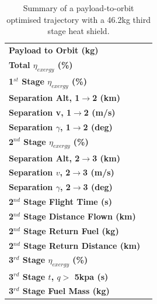 \begin{table}[!ht]
	\centering
	
	\begin{tabular}{l c } 
		\hline \textbf{Payload to Orbit (kg)}
		& \textbf{\PayloadToOrbitTPSreduced}
		\\
		\textbf{Total $\eta_{exergy}$ (\%)}
		& \textbf{\totalExergyEffTPSreduced}
		\\
		\hline 
		\textbf{1$^{st}$ Stage $\eta_{exergy}$ (\%)}
		& \textbf{\firstExergyEffTPSreduced}
		\\
		\textbf{Separation Alt, 1$\rightarrow$2 (km)}
		& \firstsecondSeparationAltTPSreduced
		\\
		\textbf{Separation v, 1$\rightarrow$2 (m/s)}
		& \firstsecondSeparationvTPSreduced
		\\
		\textbf{Separation $\gamma$, 1$\rightarrow$2 (deg)}
		& \firstsecondSeparationgammaTPSreduced
		\\
		\hline 
		\textbf{2$^{nd}$ Stage $\eta_{exergy}$ (\%)}
		& \textbf{\secondExergyEffTPSreduced}
		\\
		\textbf{Separation Alt, 2$\rightarrow$3 (km)}
		& \secondthirdSeparationAltTPSreduced
		\\
		\textbf{Separation $v$, 2$\rightarrow$3 (m/s)}
		& \secondthirdSeparationvTPSreduced
		\\
		\textbf{Separation $\gamma$, 2$\rightarrow$3 (deg)}
		& \secondthirdSeparationgammaTPSreduced
		\\
		\textbf{2$^{nd}$ Stage Flight Time (s)}
		& \secondFlightTimeTPSreduced
		\\
		\textbf{2$^{nd}$ Stage Distance Flown (km)}
		& \SecondDistTPSreduced
		\\
		\textbf{2$^{nd}$ Stage Return Fuel (kg)}
		& \returnFuelTPSreduced
		\\
		\textbf{2$^{nd}$ Stage Return Distance (km)}
		& \returnDistTPSreduced
		\\
		\hline 
		\textbf{3$^{rd}$ Stage $\eta_{exergy}$ (\%)}
		& \textbf{\thirddExergyEffTPSreduced}
		\\
		\textbf{3$^{rd}$ Stage $t$, $q >$ 5kpa (s)}
		& \thirdqOverFiveTPSreduced
		\\
		\textbf{3$^{rd}$ Stage Fuel Mass (kg)}
		& \thirdmFuelTPSreduced
		\\
		\hline 
	\end{tabular} 
	\caption{Summary of a payload-to-orbit optimised trajectory with a 46.2kg third stage heat shield.}
	\label{tab:heatshieldreduced}
	
\end{table}

